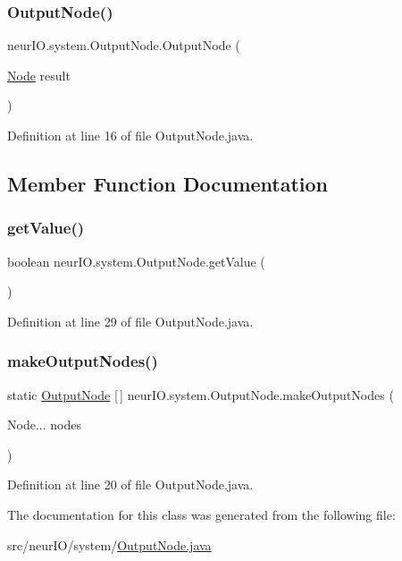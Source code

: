 \subsubsection{\texorpdfstring{Output\+Node()}{OutputNode()}}
{\footnotesize\ttfamily neur\+I\+O.\+system.\+Output\+Node.\+Output\+Node (\begin{DoxyParamCaption}\item[{\hyperlink{classneur_i_o_1_1system_1_1_node}{Node}}]{result }\end{DoxyParamCaption})}



Definition at line 16 of file Output\+Node.\+java.



\subsection{Member Function Documentation}
\mbox{\label{classneur_i_o_1_1system_1_1_output_node_ae5d244e5bb2168f66acbca5854fc614c}} 
\subsubsection{\texorpdfstring{get\+Value()}{getValue()}}
{\footnotesize\ttfamily boolean neur\+I\+O.\+system.\+Output\+Node.\+get\+Value (\begin{DoxyParamCaption}{ }\end{DoxyParamCaption})}



Definition at line 29 of file Output\+Node.\+java.

\mbox{\label{classneur_i_o_1_1system_1_1_output_node_a7573728315335709ca81071b797f62b8}} 
\subsubsection{\texorpdfstring{make\+Output\+Nodes()}{makeOutputNodes()}}
{\footnotesize\ttfamily static \hyperlink{classneur_i_o_1_1system_1_1_output_node}{Output\+Node} \mbox{[}$\,$\mbox{]} neur\+I\+O.\+system.\+Output\+Node.\+make\+Output\+Nodes (\begin{DoxyParamCaption}\item[{Node...}]{nodes }\end{DoxyParamCaption})\hspace{0.3cm}{\ttfamily [static]}}



Definition at line 20 of file Output\+Node.\+java.



The documentation for this class was generated from the following file\+:\begin{DoxyCompactItemize}
\item 
src/neur\+I\+O/system/\hyperlink{_output_node_8java}{Output\+Node.\+java}\end{DoxyCompactItemize}
